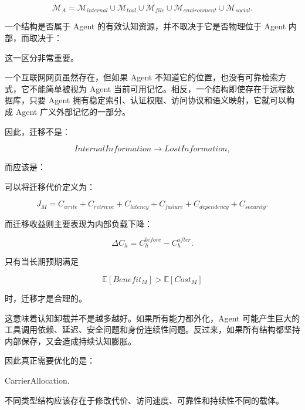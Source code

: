 \[
\mathcal M_A
=
\mathcal M_{internal}
\cup
\mathcal M_{tool}
\cup
\mathcal M_{file}
\cup
\mathcal M_{environment}
\cup
\mathcal M_{social}.
\]

一个结构是否属于 Agent 的有效认知资源，并不取决于它是否物理位于 Agent 内部，而取决于：

\begin{statementbox}
\centering
{}
\end{statementbox}

这一区分非常重要。

一个互联网网页虽然存在，但如果 Agent 不知道它的位置，也没有可靠检索方式，它不能简单被视为 Agent 当前可用记忆。相反，一个结构即使存在于远程数据库，只要 Agent 拥有稳定索引、认证权限、访问协议和语义映射，它就可以构成 Agent 广义外部记忆的一部分。

因此，迁移不是：

\[
InternalInformation
\rightarrow
LostInformation,
\]

而应该是：

\begin{statementbox}
\centering
{}
\end{statementbox}

可以将迁移代价定义为：

\[
J_M
=
C_{write}
+
C_{retrieve}
+
C_{latency}
+
C_{failure}
+
C_{dependency}
+
C_{security}.
\]

而迁移收益则主要表现为内部负载下降：

\[
\Delta C_h
=
C_h^{before}
-
C_h^{after}.
\]

只有当长期预期满足

\[
\mathbb E
[
Benefit_M
]
>
\mathbb E
[
Cost_M
]
\]

时，迁移才是合理的。

这意味着认知卸载并不是越多越好。如果所有能力都外化，Agent 可能产生巨大的工具调用依赖、延迟、安全问题和身份连续性问题。反过来，如果所有结构都坚持内部保存，又会造成持续认知膨胀。

因此真正需要优化的是：

\begin{statementbox}
CarrierAllocation.
\end{statementbox}

不同类型结构应该存在于修改代价、访问速度、可靠性和持续性不同的载体。

